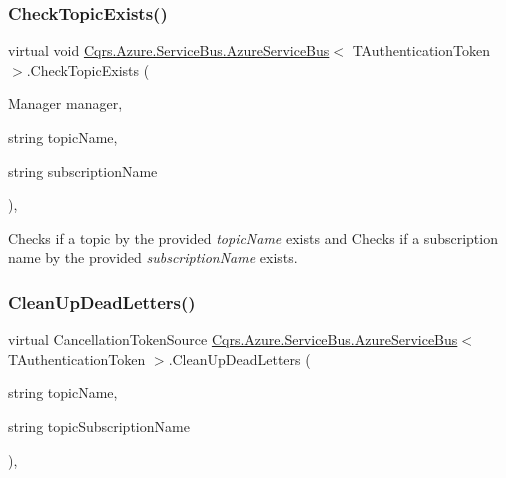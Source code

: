 \subsubsection{\texorpdfstring{Check\+Topic\+Exists()}{CheckTopicExists()}}
{\footnotesize\ttfamily virtual void \hyperlink{classCqrs_1_1Azure_1_1ServiceBus_1_1AzureServiceBus}{Cqrs.\+Azure.\+Service\+Bus.\+Azure\+Service\+Bus}$<$ T\+Authentication\+Token $>$.Check\+Topic\+Exists (\begin{DoxyParamCaption}\item[{Manager}]{manager,  }\item[{string}]{topic\+Name,  }\item[{string}]{subscription\+Name }\end{DoxyParamCaption})\hspace{0.3cm}{\ttfamily [protected]}, {\ttfamily [virtual]}}



Checks if a topic by the provided {\itshape topic\+Name}  exists and Checks if a subscription name by the provided {\itshape subscription\+Name}  exists. 

\mbox{\label{classCqrs_1_1Azure_1_1ServiceBus_1_1AzureServiceBus_a8d1d5833d49b7793933825f2a13fb8b7_a8d1d5833d49b7793933825f2a13fb8b7}} 
\subsubsection{\texorpdfstring{Clean\+Up\+Dead\+Letters()}{CleanUpDeadLetters()}}
{\footnotesize\ttfamily virtual Cancellation\+Token\+Source \hyperlink{classCqrs_1_1Azure_1_1ServiceBus_1_1AzureServiceBus}{Cqrs.\+Azure.\+Service\+Bus.\+Azure\+Service\+Bus}$<$ T\+Authentication\+Token $>$.Clean\+Up\+Dead\+Letters (\begin{DoxyParamCaption}\item[{string}]{topic\+Name,  }\item[{string}]{topic\+Subscription\+Name }\end{DoxyParamCaption})\hspace{0.3cm}{\ttfamily [protected]}, {\ttfamily [virtual]}}



